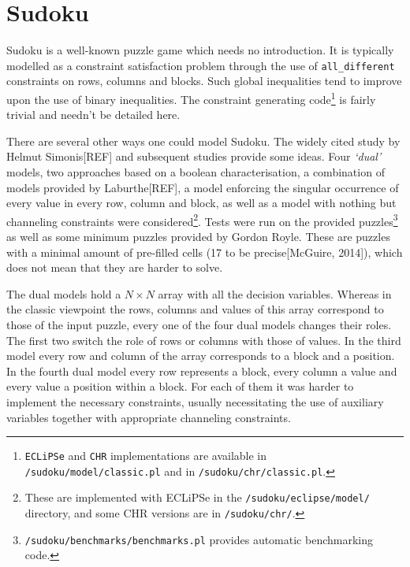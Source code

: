 \section{Sudoku}

Sudoku\cite{article:test} is a well-known puzzle game which needs no introduction. It is typically modelled as a constraint satisfaction problem through the use of \texttt{all\_different} constraints on rows, columns and blocks. Such global inequalities tend to improve upon the use of binary inequalities. The constraint generating code\footnote{\texttt{ECLiPSe} and \texttt{CHR} implementations are available in \texttt{/sudoku/model/classic.pl} and in \texttt{/sudoku/chr/classic.pl}.} is fairly trivial and needn't be detailed here. \\\par

There are several other ways one could model Sudoku. The widely cited study by Helmut Simonis[REF] and subsequent studies provide some ideas. Four \textit{`dual'} models, two approaches based on a boolean characterisation, a combination of models provided by Laburthe[REF], a model enforcing the singular occurrence of every value in every row, column and block, as well as a model with nothing but channeling constraints were considered\footnote{These are implemented with ECLiPSe in the \texttt{/sudoku/eclipse/model/} directory, and some CHR versions are in \texttt{/sudoku/chr/}.}. Tests were run on the provided puzzles\footnote{\texttt{/sudoku/benchmarks/benchmarks.pl} provides automatic benchmarking code.} as well as some minimum puzzles provided by Gordon Royle. These are puzzles with a minimal amount of pre-filled cells (17 to be precise[McGuire, 2014]), which does not mean that they are harder to solve. \\\par

The dual models hold a $N\times N$ array with all the decision variables. Whereas in the classic viewpoint the rows, columns and values of this array correspond to those of the input puzzle, every one of the four dual models changes their roles. The first two switch the role of rows or columns with those of values. In the third model every row and column of the array corresponds to a block and a position. In the fourth dual model every row represents a block, every column a value and every value a position within a block. For each of them it was harder to implement the necessary constraints, usually necessitating the use of auxiliary variables together with appropriate channeling constraints.\\\par  

